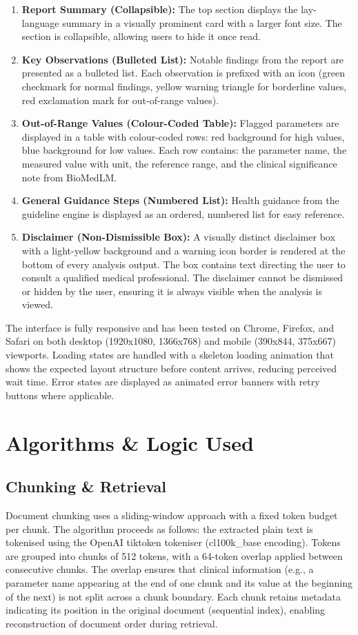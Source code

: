 \begin{enumerate}
    \item \textbf{Report Summary (Collapsible):} The top section displays the lay-language summary in a visually prominent card with a larger font size. The section is collapsible, allowing users to hide it once read.
    \item \textbf{Key Observations (Bulleted List):} Notable findings from the report are presented as a bulleted list. Each observation is prefixed with an icon (green checkmark for normal findings, yellow warning triangle for borderline values, red exclamation mark for out-of-range values).
    \item \textbf{Out-of-Range Values (Colour-Coded Table):} Flagged parameters are displayed in a table with colour-coded rows: red background for high values, blue background for low values. Each row contains: the parameter name, the measured value with unit, the reference range, and the clinical significance note from BioMedLM.
    \item \textbf{General Guidance Steps (Numbered List):} Health guidance from the guideline engine is displayed as an ordered, numbered list for easy reference.
    \item \textbf{Disclaimer (Non-Dismissible Box):} A visually distinct disclaimer box with a light-yellow background and a warning icon border is rendered at the bottom of every analysis output. The box contains text directing the user to consult a qualified medical professional. The disclaimer cannot be dismissed or hidden by the user, ensuring it is always visible when the analysis is viewed.
\end{enumerate}

The interface is fully responsive and has been tested on Chrome, Firefox, and Safari on both desktop (1920x1080, 1366x768) and mobile (390x844, 375x667) viewports. Loading states are handled with a skeleton loading animation that shows the expected layout structure before content arrives, reducing perceived wait time. Error states are displayed as animated error banners with retry buttons where applicable.

\section{Algorithms \& Logic Used}

\subsection{Chunking \& Retrieval}
Document chunking uses a sliding-window approach with a fixed token budget per chunk. The algorithm proceeds as follows: the extracted plain text is tokenised using the OpenAI tiktoken tokeniser (cl100k\_base encoding). Tokens are grouped into chunks of 512 tokens, with a 64-token overlap applied between consecutive chunks. The overlap ensures that clinical information (e.g., a parameter name appearing at the end of one chunk and its value at the beginning of the next) is not split across a chunk boundary. Each chunk retains metadata indicating its position in the original document (sequential index), enabling reconstruction of document order during retrieval.

